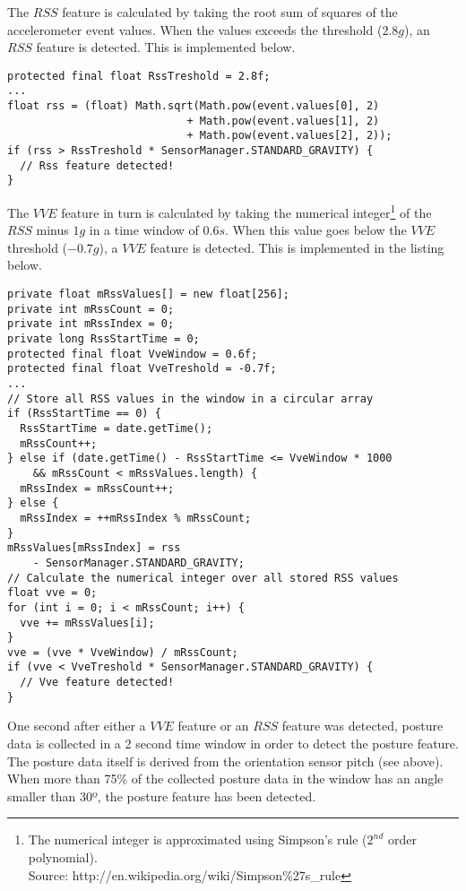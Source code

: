 The $RSS$ feature is calculated by taking the root sum of squares of the accelerometer event values. When the values exceeds the threshold ($2.8g$), an $RSS$ feature is detected. This is implemented below.
\begin{lstlisting}
protected final float RssTreshold = 2.8f;
...
float rss = (float) Math.sqrt(Math.pow(event.values[0], 2)
                            + Math.pow(event.values[1], 2)
                            + Math.pow(event.values[2], 2));
if (rss > RssTreshold * SensorManager.STANDARD_GRAVITY) {  
  // Rss feature detected!
}
\end{lstlisting}
The $VVE$ feature in turn is calculated by taking the numerical integer\footnote{The numerical integer is approximated using Simpson's rule ($2^{nd}$ order polynomial).\\Source: http://en.wikipedia.org/wiki/Simpson\%27s\_rule} of the $RSS$ minus $1g$ in a time window of $0.6s$. When this value goes below the $VVE$ threshold ($-0.7g$), a $VVE$ feature is detected. This is implemented in the listing below.
\begin{lstlisting}
private float mRssValues[] = new float[256];
private int mRssCount = 0;
private int mRssIndex = 0;
private long RssStartTime = 0;
protected final float VveWindow = 0.6f;
protected final float VveTreshold = -0.7f;
...
// Store all RSS values in the window in a circular array
if (RssStartTime == 0) {
  RssStartTime = date.getTime();
  mRssCount++;
} else if (date.getTime() - RssStartTime <= VveWindow * 1000
    && mRssCount < mRssValues.length) {
  mRssIndex = mRssCount++;
} else {
  mRssIndex = ++mRssIndex % mRssCount;
}
mRssValues[mRssIndex] = rss
    - SensorManager.STANDARD_GRAVITY;
// Calculate the numerical integer over all stored RSS values
float vve = 0;
for (int i = 0; i < mRssCount; i++) {
  vve += mRssValues[i];
}
vve = (vve * VveWindow) / mRssCount;
if (vve < VveTreshold * SensorManager.STANDARD_GRAVITY) {
  // Vve feature detected!
}
\end{lstlisting}
One second after either a $VVE$ feature or an $RSS$ feature was detected, posture data is collected in a 2 second time window in order to detect the posture feature. The posture data itself is derived from the orientation sensor pitch (see above). When more than 75\% of the collected posture data in the window has an angle smaller than 30º, the posture feature has been detected.
